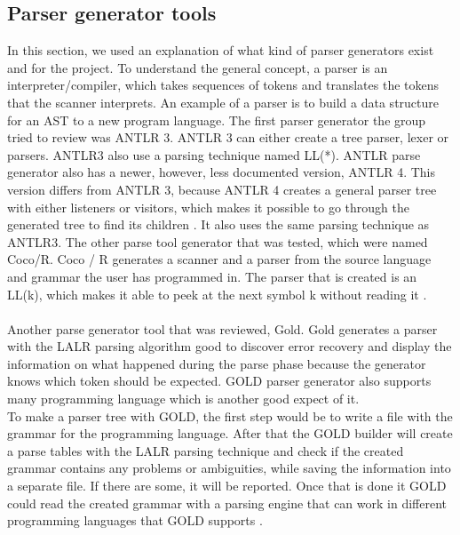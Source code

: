 \subsection{Parser generator tools}
In this section, we used an explanation of what kind of parser generators exist and for the project. To understand the general concept, a parser is an interpreter/compiler, which takes sequences of tokens and translates the tokens that the scanner interprets. An example of a parser is to build a data structure for an AST to a new program language.
The first parser generator the group tried to review was ANTLR 3. ANTLR 3 can either create a tree parser, lexer or parsers. ANTLR3 also use a parsing  technique named LL(*). ANTLR parse generator also has a newer, however, less documented version, ANTLR 4. This version differs from ANTLR 3, because ANTLR 4 creates a general parser tree with either listeners or visitors, which makes it possible to go through the generated tree to find its children \cite{ANTLR4-Why}. It also uses the same parsing technique as ANTLR3. The other parse tool generator that was tested, which were named Coco/R. Coco / R generates a scanner and a parser from the source language and grammar the user has programmed in. The parser that is created is an LL(k), which makes it able to peek at the next symbol k without reading it \cite{COCO/R}. \\
\\
Another parse generator tool that was reviewed, Gold. Gold generates a parser with the LALR parsing algorithm good to discover error recovery and display the information on what happened during the parse phase because the generator knows which token should be expected. GOLD parser generator also supports many programming language which is another good expect of it.\\
To make a parser tree with GOLD, the first step would be to write a file with the grammar for the programming language. After that the GOLD builder will create a parse tables with the LALR parsing technique and check if the created grammar contains any problems or ambiguities, while saving the information into a separate file. If there are some, it will be reported. Once that is done it GOLD could read the created grammar with a parsing engine that can work in different programming languages that GOLD supports \cite{GOLD}. 
\\

